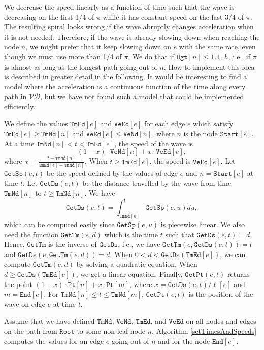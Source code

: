 \documentclass[3p]{elsarticle}
\newcommand{\VD}{\mathcal{VD}}
\newcommand{\nodeStart}{\texttt{Start}}
\newcommand{\nodeEnd}{\texttt{End}}
\newcommand{\ttimeO}{\texttt{TmNd}}
\newcommand{\ttimeT}{\texttt{TmEd}}
\newcommand{\speedO}{\texttt{VeNd}}
\newcommand{\speedT}{\texttt{VeEd}}
\newcommand{\height}{\texttt{Hgt}}
\newcommand{\getSpeed}{\texttt{GetSp}}
\newcommand{\getDist}{\texttt{GetDs}}
\newcommand{\getTime}{\texttt{GetTm}}
\newcommand{\getPoint}{\texttt{GetPt}}
\newcommand{\rootNode}{\texttt{Root}}
\newcommand{\point}{\texttt{Pt}}
\begin{document}
We decrease the speed linearly
as a function of time such that the wave is decreasing on the first 1/4 of $\pi$
while it has constant speed on the last 3/4 of $\pi$.
The resulting spiral looks wrong if the wave abruptly changes acceleration when it is not needed.
Therefore, if the wave is already slowing down when reaching the node $n$, we might prefer that it keep
slowing down on $e$ with the same rate, even though we must use more than 1/4
of $\pi$. We do that if $\height[n]\leq 1.1\cdot h$, i.e., if $\pi$ is almost as long
as the longest path going out of $n$.
How to implement this idea is described in greater detail in the following.
It would be interesting to find a model where the acceleration is a continuous function
of the time along every path in $\VD$, but we have not found such a model that could be implemented
efficiently.

We define the values $\ttimeT[e]$ and $\speedT[e]$
for each edge $e$ which satisfy
$\ttimeT[e]\geq\ttimeO[n]$ and $\speedT[e]\leq\speedO[n]$,
where $n$ is the node $\nodeStart[e]$.
At a time $\ttimeO[n]<t<\ttimeT[e]$,
the speed of the wave is
$$(1-x)\cdot \speedO[n] + x\cdot \speedT[e],$$
where
$x = \frac{t-\ttimeO[n]}{\ttimeT[e]-\ttimeO[n]}$. When $t\geq\ttimeT[e]$, the speed
is $\speedT[e]$. Let $\getSpeed(e,t)$ be the speed defined by the values of edge $e$ and
$n=\nodeStart[e]$
at time $t$. Let $\getDist(e, t)$ be the distance travelled by the wave from time
$\ttimeO[n]$ to $t\geq \ttimeO[n]$.
We have
$$\getDist(e,t) = \int_{\ttimeO[n]}^t \getSpeed(e,u)du,$$
which can be computed easily since $\getSpeed(e,u)$ is piecewise linear.
We also need the function $\getTime(e,d)$ which is the time $t$ such that $\getDist(e,t)=d$.
Hence, $\getTime$ is the inverse of $\getDist$, i.e., we have
$\getTime(e,\getDist(e,t)) = t$ and $\getDist(e, \getTime(e,d)) = d$.
When $0<d<\getDist(\ttimeT[e])$, we can compute
$\getTime(e,d)$ by solving a quadratic equation. When
$d\geq \getDist(\ttimeT[e])$, we get a linear equation.
Finally, $\getPoint(e,t)$ returns the point
$(1-x)\cdot \point[n] + x\cdot \point[m]$,
where $x=\getDist(e,t)/\ell[e]$ and $m=\nodeEnd[e]$.
For $\ttimeO[n]\leq t\leq\ttimeO[m]$, $\getPoint(e,t)$ is the position of the wave on
edge $e$ at time $t$.

Assume that we have defined $\ttimeO$, $\speedO$, $\ttimeT$, and $\speedT$ on all
nodes and edges on the path from $\rootNode$ to some non-leaf node $n$.
Algorithm \ref{setTimesAndSpeeds} computes the values for an edge $e$ going out of
$n$ and for the node $\nodeEnd[e]$.
\end{document}

